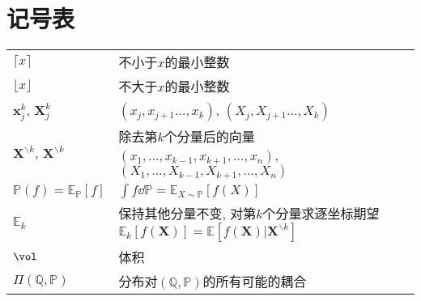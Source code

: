 \section*{记号表}

\noindent
\begin{tabular}{p{} p{}}
\hline
	$\lceil x \rceil$ & 不小于$x$的最小整数 \\
	$\lfloor x \rfloor$ & 不大于$x$的最小整数 \\
	$\bm{x}_j^k$, $\bm{X}_j^k$ & $(x_j, x_{j+1} \dots, x_k)$, $(X_j, X_{j+1} \dots, X_k)$ \\
	$\bm{X}^{\backslash k}$, $\bm{X}^{\backslash k}$ & 除去第$k$个分量后的向量$(x_1, \dots, x_{k-1}, x_{k+1}, \dots, x_n)$, $(X_1, \dots, X_{k-1}, X_{k+1}, \dots, X_n)$ \\
	$\mathbb{P}(f) = \mathbb{E}_{\mathbb{P}}[f]$ & $\int f \dd \mathbb{P} = \mathbb{E}_{X \sim \mathbb{P}} [f(X)]$ \\
	$\mathbb{E}_k$ & 保持其他分量不变, 对第$k$个分量求逐坐标期望$\mathbb{E}_k[f(\bm{X})] = \mathbb{E}[f(\bm{X}) | \bm{X}^{\backslash k}]$ \\
	$\vol$ & 体积 \\
	$\Pi(\mathbb{Q}, \mathbb{P})$ & 分布对$(\mathbb{Q}, \mathbb{P})$的所有可能的耦合 \\
\hline
\end{tabular}
